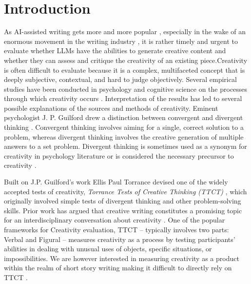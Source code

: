 \section{Introduction}
\label{sec:intro}


As AI-assisted writing gets more and more popular  \cite{AIassistedWriting1, AIassistedWriting2}, especially in the wake of an enormous movement in the writing industry \cite{WGA}, it is rather timely and urgent to evaluate whether LLMs have the abilities to generate creative content and whether they can assess and critique the creativity of an existing piece.Creativity is often difficult to evaluate because it is a complex, multifaceted concept that is deeply subjective, contextual, and hard to judge objectively. Several empirical studies have been conducted in psychology and cognitive science on the processes through which creativity occurs \cite{kurtzberg2005feeling,cropley2000defining,silvia2008assessing}. Interpretation of the results has led to several possible explanations of the sources and methods of creativity. Eminent psychologist J. P. Guilford drew a distinction between convergent and divergent thinking \cite{guilford1967nature}. Convergent thinking involves aiming for a single, correct solution to a problem, whereas divergent thinking involves the creative generation of multiple answers to a set problem. Divergent thinking is sometimes used as a synonym for creativity in psychology literature or is considered the necessary precursor to creativity \cite{RUNCO2011400}. 

Built on J.P. Guilford's work Ellis Paul Torrance devised one of the widely accepted tests of creativity, \textit{Torrance Tests of Creative Thinking (TTCT)} \cite{torrance1966torrance}, which originally involved simple tests of divergent thinking and other problem-solving skills. Prior work has argued that creative writing constitutes a promising topic for an interdisciplinary conversation about creativity \cite{Doyle1998TheWT}. One of the popular frameworks for Creativity evaluation, TTCT -- typically involves two parts: Verbal and Figural -- measures creativity as a process by testing participants' abilities in dealing with unusual uses of objects, specific situations, or impossibilities. We are however interested in measuring creativity as a product within the realm of short story writing making it difficult to directly rely on TTCT \cite {baer2009assessing}.

